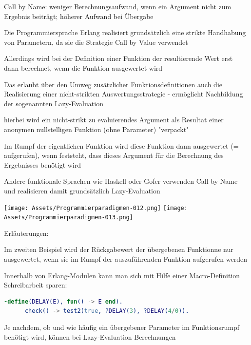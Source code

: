 \documentclass[10pt]{article}
\begin{document}
\begin{itemize*}
\begin{itemize*}
      \item Call by Name: weniger Berechnungsaufwand, wenn ein Argument nicht zum Ergebnis beiträgt; höherer Aufwand bei Übergabe
    \end{itemize*}
    \item Die Programmiersprache Erlang realisiert grundsätzlich eine strikte Handhabung von Parametern, da sie die Strategie Call by Value verwendet
    \item Allerdings wird bei der Definition einer Funktion der resultierende Wert erst dann berechnet, wenn die Funktion ausgewertet wird
    \begin{itemize*}
      \item Das erlaubt über den Umweg zusätzlicher Funktionsdefinitionen auch die Realisierung einer nicht-strikten Auswertungsstrategie - ermöglicht Nachbildung der sogenannten Lazy-Evaluation
      \item hierbei wird ein nicht-strikt zu evaluierendes Argument als Resultat einer anonymen nullstelligen Funktion (ohne Parameter) "verpackt"
      \item Im Rumpf der eigentlichen Funktion wird diese Funktion dann ausgewertet (= aufgerufen), wenn feststeht, dass dieses Argument für die Berechnung des Ergebnisses benötigt wird
      \item Andere funktionale Sprachen wie Haskell oder Gofer verwenden Call by Name und realisieren damit grundsätzlich Lazy-Evaluation
    \end{itemize*}
    \begin{center}
      \texttt{[image: Assets/Programmierparadigmen-012.png]}
      \texttt{[image: Assets/Programmierparadigmen-013.png]}
    \end{center}
    \item Erläuterungen:
    \begin{itemize*}
      \item Im zweiten Beispiel wird der Rückgabewert der übergebenen Funktionne nur ausgewertet, wenn sie im Rumpf der auszuführenden Funktion aufgerufen werden
      \item Innerhalb von Erlang-Modulen kann man sich mit Hilfe einer Macro-Definition Schreibarbeit sparen:
      \begin{lstlisting}[language=erlang] 
      -define(DELAY(E), fun() -> E end).
      check() -> test2(true, ?DELAY(3), ?DELAY(4/0)).
    \end{lstlisting}
    \end{itemize*}
    \item Je nachdem, ob und wie häufig ein übergebener Parameter im Funktionsrumpf benötigt wird, können bei Lazy-Evaluation Berechnungen

\end{itemize*}
\end{document}
